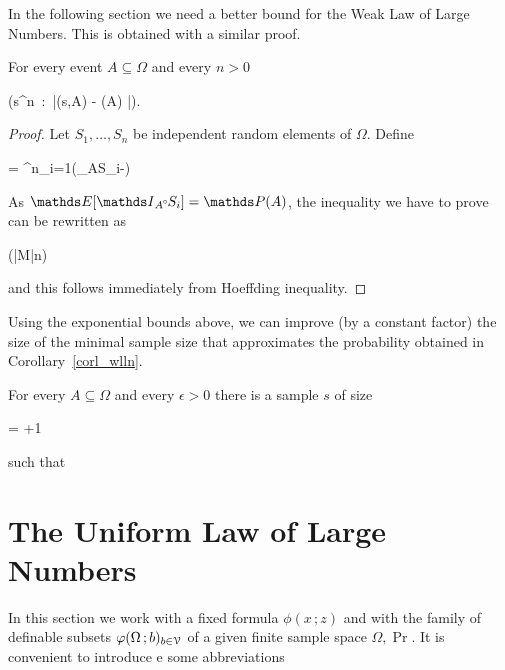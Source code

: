 \documentclass[scombinatorics.tex]{subfiles}
\begin{document}
In the following section we need a better bound for the Weak Law of Large Numbers.
This is obtained with a similar proof.

\begin{void_thm}
  For every event $A\subseteq\Omega$ and every $n>0$
  
  {\ge}
  {\Pr \Big(s\in\Omega^n\ :\ \big|\Fr(s,A) - \Pr(A)  \big|\ge\epsilon\Big).}
\end{void_thm}

\begin{proof}
  Let $S_1,\dots,S_n$ be independent random elements of $\Omega$.
  Define
  
  {=}
  {\sum^n_{i=1}\Big(\Indicator_A\smallcirc S_i-\Big)}

  As $\Ex[\Indicator_A\smallcirc S_i]=\Pr(A)$, the inequality we have to prove can be rewritten as 

  {\ge}
  {\Pr \Big(|M|\ge n\epsilon\Big)}

  and this follows immediately from Hoeffding inequality.
  \end{proof}


Using the exponential bounds above, we can improve (by a constant factor) the size of the minimal sample size that approximates the probability obtained in Corollary~\ref{corl_wlln}.

\begin{corollary}
  For every $A\subseteq\Omega$ and every $\epsilon>0$ there is a sample $s$ of size

      {=}
      {\left\lfloor{}+1\right\rfloor} 
      
  such that

  \QED
\end{corollary}


\section{The Uniform Law of Large Numbers}\label{uniform}
\def\medrel#1{\parbox[t]{5ex}{$\displaystyle\hfil #1$}}
\def\ceq#1#2#3{\parbox[t]{35ex}{$\displaystyle #1$}\medrel{#2}{$\displaystyle #3$}}

In this section we work with a fixed formula $\phi(x\,;z)$ and with the family of definable subsets $\varphi(\Omega\,;b)_{b\in\EuScript V}$ of a given finite sample space $\Omega,\Pr$.
It is convenient to introduce e some abbreviations
\end{document}
